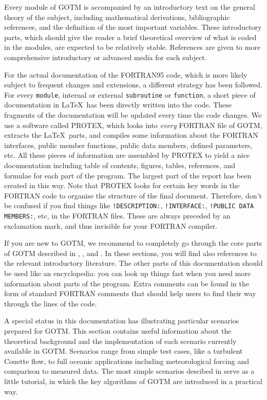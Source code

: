 Every module of GOTM is accompanied by an introductory text on the
general theory of the subject, including mathematical derivations,
bibliographic references, and the definition of the most important
variables. These introductory parts, which should give the reader a
brief theoretical overview of what is coded in the modules, are
expected to be relatively stable. References are given to more
comprehensive introductory or advanced media for each subject.

For the actual documentation of the FORTRAN95 code, which is more
likely subject to frequent changes and extensions, a different
strategy has been followed. For every {\tt module}, internal or
external {\tt subroutine} or {\tt function}, a short piece of
documentation in \LaTeX\ has been directly written into the
code. These fragments of the documentation will be updated every time
the code changes. We use a software called PROTEX, which looks into
\emph{every} FORTRAN file of GOTM, extracts the \LaTeX\ parts, and
compiles some information about the FORTRAN interfaces, public member
functions, public data members, defined parameters, etc. All these
pieces of information are assembled by PROTEX to yield a nice
documentation including table of contents, figures, tables,
references, and formulae for each part of the program. The largest
part of the report has been created in this way. Note that PROTEX
looks for certain key words in the FORTRAN code to organise the
structure of the final document. Therefore, don't be confused if you
find things like {\tt !DESCRIPTION:}, {\tt !INTERFACE:}, {\tt !PUBLIC
DATA MEMBERS:}, etc, in the FORTRAN files. These are always preceded
by an exclamation mark, and thus invisible for your FORTRAN compiler.

If you are new to GOTM, we recommend to completely go through the core
parts of GOTM described in , ,
and . In these sections, you will find also
references to the relevant introductory literature. The other
parts of this documentation should be used like an encyclopedia: you
can look up things fast when you need more information about parts
of the program. Extra comments can be found in the form of standard
FORTRAN comments that should help users to find their way through the
lines of the code.

A special status in this documentation has 
illustrating particular scenarios prepared for GOTM. This section contains
useful information about the theoretical background and the
implementation of each scenario currently available in GOTM. Scenarios
range from simple test cases, like a turbulent Couette flow, to full
oceanic applications including meteorological forcing and comparison
to measured data. The most simple scenarios descibed in 
serve as a little tutorial, in which the key algorithms of
GOTM are introduced in a practical way.

